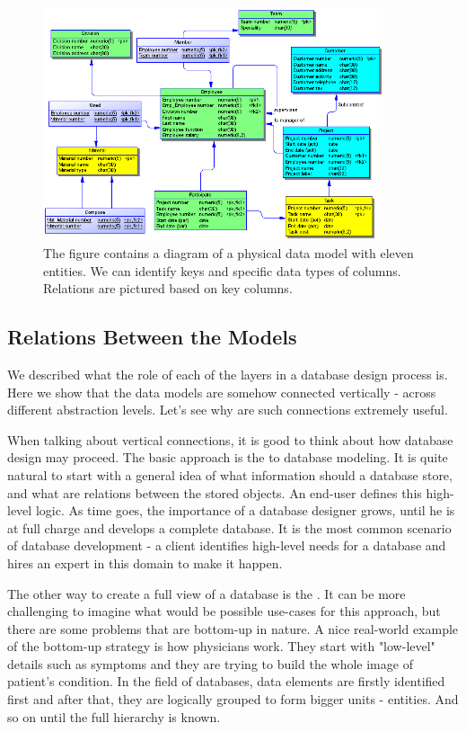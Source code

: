\begin{figure}[H]
	\centering
	\includegraphics[width=10cm]{../img/Physical_Model_PowerDesigner}
	\caption[Physical diagram \cite{PowerDesignerDocumentation}]{The figure contains a diagram of a physical data model with eleven entities. We can identify keys and specific data types of columns. Relations are pictured based on key columns.}
\end{figure}

\subsection{Relations Between the Models}

We described what the role of each of the layers in a database design process is.
Here we show that the data models are somehow connected vertically - across different abstraction levels. Let's see why are such connections extremely useful.

When talking about vertical connections, it is good to think about how database design may proceed.
The basic approach is the  to database modeling.
It is quite natural to start with a general idea of what information should a database store, and what are relations between the stored objects. 
An end-user defines this high-level logic. 
As time goes, the importance of a database designer grows, until he is at full charge and develops a complete database. 
It is the most common scenario of database development - a client identifies high-level needs for a database and hires an expert in this domain to make it happen.

The other way to create a full view of a database is the . It can be more challenging to imagine what would be possible use-cases for this approach, but there are some problems that are bottom-up in nature. 
A nice real-world example of the bottom-up strategy is how physicians work. 
They start with "low-level" details such as symptoms and they are trying to build the whole image of patient's condition. 
In the field of databases, data elements are firstly identified first and after that, they are logically grouped to form bigger units - entities. And so on until the full hierarchy is known.

